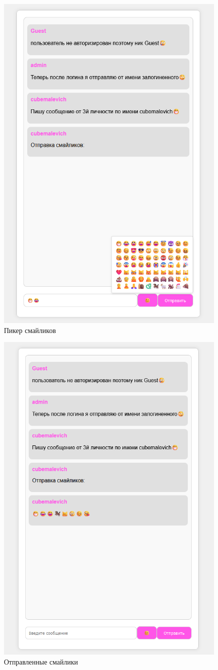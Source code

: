 \begin{enumerate}
	\begin{figure}[H]
		\centering
		\includegraphics[width=0.7\linewidth]{images/smile_picker}
		\caption{Пикер смайликов}
		\label{fig:smilepicker}
	\end{figure}
		
	\begin{figure}[H]
		\centering
		\includegraphics[width=0.7\linewidth]{images/send_smile}
		\caption{Отправленные смайлики}
		\label{fig:sendsmile}
	\end{figure}
	

\end{enumerate}
